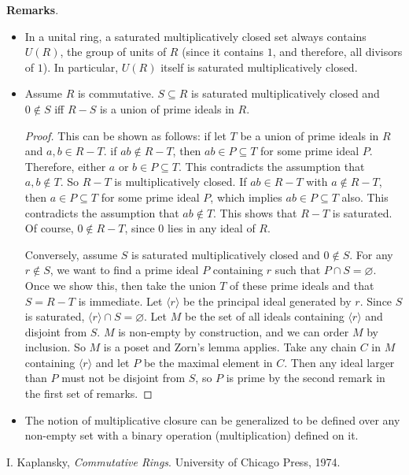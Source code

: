 \documentclass[12pt]{article}
\begin{document}
\textbf{Remarks}.
\begin{itemize}
\item
In a unital ring, a saturated multiplicatively closed set always contains $U(R)$, the group of units of $R$ (since it contains $1$, and therefore, all divisors of $1$).  In particular, $U(R)$ itself is saturated multiplicatively closed.
\item Assume $R$ is commutative.  $S\subseteq R$ is saturated multiplicatively closed and $0\notin S$ iff $R-S$ is a union of prime ideals in $R$.  
\begin{proof}
This can be shown as follows: if let $T$ be a union of prime ideals in $R$ and $a,b\in R-T$. if $ab\notin R-T$, then $ab\in P\subseteq T$ for some prime ideal $P$.  Therefore, either $a$ or $b\in P\subseteq T$.  This contradicts the assumption that $a,b\notin T$.  So $R-T$ is multiplicatively closed.  If $ab \in R-T$ with $a\notin R-T$, then $a\in P\subseteq T$ for some prime ideal $P$, which implies $ab\in P\subseteq T$ also.  This contradicts the assumption that $ab\notin T$.  This shows that $R-T$ is saturated.  Of course, $0\notin R-T$, since $0$ lies in any ideal of $R$.

Conversely, assume $S$ is saturated multiplicatively closed and $0\notin S$.  For any $r\notin S$, we want to find a prime ideal $P$ containing $r$ such that $P\cap S=\varnothing$.  Once we show this, then take the union $T$ of these prime ideals and that $S=R-T$ is immediate.  Let $\langle r\rangle$ be the principal ideal generated by $r$.  Since $S$ is saturated, $\langle r\rangle\cap S=\varnothing$.  Let $M$ be the set of all ideals containing $\langle r\rangle$ and disjoint from $S$.  $M$ is non-empty by construction, and we can order $M$ by inclusion.  So $M$ is a poset and Zorn's lemma applies.  Take any chain $C$ in $M$ containing $\langle r\rangle$ and let $P$ be the maximal element in $C$.  Then any ideal larger than $P$ must not be disjoint from $S$, so $P$ is prime by the second remark in the first set of remarks.
\end{proof}
\item The notion of multiplicative closure can be generalized to be defined over any non-empty set with a binary operation (multiplication) defined on it.
\end{itemize}

\begin{thebibliography}{3}
 I. Kaplansky, {\it Commutative Rings}. University of Chicago Press, 1974.
\end{thebibliography}
\end{document}
